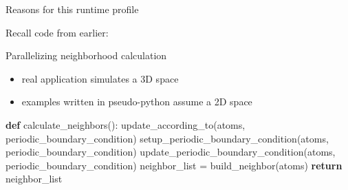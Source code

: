 \documentclass[ignorenonframetext,]{beamer}
\newenvironment{Shaded}{}{}
\newcommand{\CommentTok}[1]{\textcolor[rgb]{0.38,0.63,0.69}{\textit{#1}}}
\newcommand{\ControlFlowTok}[1]{\textcolor[rgb]{0.00,0.44,0.13}{\textbf{#1}}}
\newcommand{\DecValTok}[1]{\textcolor[rgb]{0.25,0.63,0.44}{#1}}
\newcommand{\FloatTok}[1]{\textcolor[rgb]{0.25,0.63,0.44}{#1}}
\newcommand{\KeywordTok}[1]{\textcolor[rgb]{0.00,0.44,0.13}{\textbf{#1}}}
\newcommand{\NormalTok}[1]{#1}
\newcommand{\OperatorTok}[1]{\textcolor[rgb]{0.40,0.40,0.40}{#1}}
\providecommand{\tightlist}{%
  \setlength{\itemsep}{0pt}\setlength{\parskip}{0pt}}
\begin{document}
\begin{frame}[fragile]

\begin{block}{Reasons for this runtime profile}

Recall code from earlier:

\begin{Shaded}
\end{Shaded}

\end{block}

\end{frame}

\begin{frame}[fragile]

\begin{block}{Parallelizing neighborhood calculation}

\begin{itemize}
\tightlist
\item
  real application simulates a 3D space
\item
  examples written in pseudo-python assume a 2D space
\end{itemize}

\begin{Shaded}
\begin{Highlighting}[]
\KeywordTok{def}\NormalTok{ calculate_neighbors():}
\NormalTok{  update_according_to(atoms, periodic_boundary_condition)}
\NormalTok{  setup_periodic_boundary_condition(atoms, periodic_boundary_condition)}
\NormalTok{  update_periodic_boundary_condition(atoms, periodic_boundary_condition)}
\NormalTok{  neighbor_list }\OperatorTok{=}\NormalTok{ build_neighbor(atoms)}
  \ControlFlowTok{return}\NormalTok{ neighbor_list}
\end{Highlighting}
\end{Shaded}

\end{block}

\end{frame}
\end{document}
